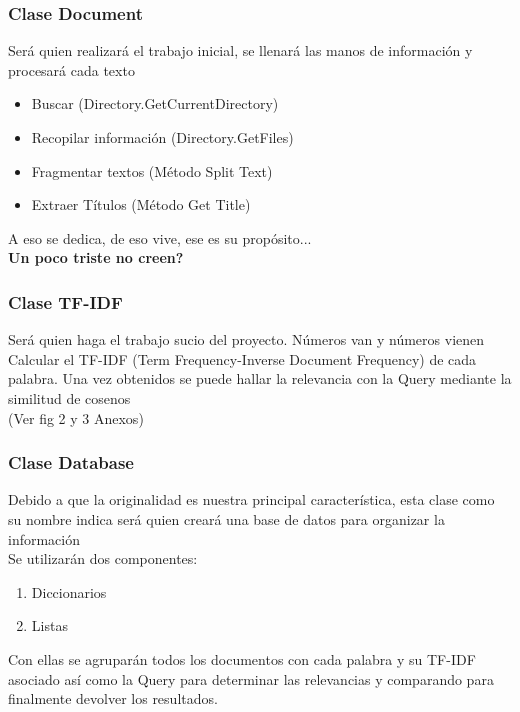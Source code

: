 \documentclass{beamer}
\begin{document}
\begin{frame}
    \frametitle{Clase Document}
    Será quien realizará el trabajo inicial, se llenará las manos de información y procesará cada texto
    \begin{itemize}
        \item Buscar (Directory.GetCurrentDirectory)
        \item Recopilar información (Directory.GetFiles)
        \item Fragmentar textos (Método Split Text)
        \item Extraer Títulos (Método Get Title)
    \end{itemize}
    A eso se dedica, de eso vive, ese es su propósito...\\
    \small{\textbf{Un poco triste no creen?}}
\end{frame}

\begin{frame}
    \frametitle{Clase TF-IDF}
    \large{Será quien haga el trabajo sucio del proyecto. Números van y números vienen}\\
    Calcular el TF-IDF (Term Frequency-Inverse Document Frequency) de cada palabra. Una vez obtenidos se puede hallar la relevancia  con la Query mediante la similitud de cosenos\\
    (Ver fig 2 y 3 Anexos)
\end{frame}

\begin{frame}
    \frametitle{Clase Database}
    Debido a que la originalidad es nuestra principal característica, esta clase como su nombre indica será quien creará una base de datos para organizar la información\\
    Se utilizarán dos componentes:
    \begin{enumerate}
        \item Diccionarios
        \item Listas
    \end{enumerate}
    Con ellas se agruparán todos los documentos con cada palabra y su TF-IDF asociado así como la Query para determinar las relevancias y comparando para finalmente devolver los resultados.
\end{frame}
\end{document}
